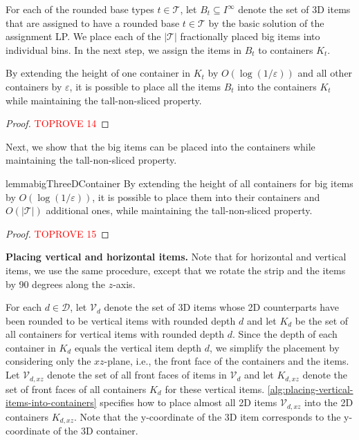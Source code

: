 \documentclass[a4paper,UKenglish,cleveref, autoref, thm-restate]{lipics-v2021}
\newcommand{\eps}{\varepsilon}
\newcommand{\bigy}{big\xspace}
\begin{document}
For each of the rounded base types $t \in \mathcal{T}$, let $B_t \subseteq I^{\infty}$ denote the set of 3D items that are assigned to have a rounded base $t \in \mathcal{T}$ by the basic solution of the assignment LP.  
We place each of the $|\mathcal{T}|$ fractionally placed \bigy items into individual bins.
In the next step, we assign the items in $B_t$ to containers $K_t$.

\begin{lemma}
\label{lem:placing-big-items-second-step}
By extending the height of one container in $K_t$ by $O(\log(1/\eps))$ and all other containers by $\eps$, it is possible to place all the items $B_t$ into the containers $K_t$ while maintaining the tall-non-sliced property.
\end{lemma}
\begin{proof}\textcolor{red}{TOPROVE 14}\end{proof}

Next, we show that the \bigy items can be placed into the containers while maintaining the tall-non-sliced property.

\begin{restatable}{lemma}{bigThreeDContainer}
\label{lem:packing-bins-into-containers}
By extending the height of all containers for \bigy items by $O(\log(1/\eps))$, it is possible to place them into their containers and $O(|\mathcal{T}|)$ additional ones, while maintaining the tall-non-sliced property.
\end{restatable}

\begin{proof}\textcolor{red}{TOPROVE 15}\end{proof}


\noindent \textbf{Placing vertical and horizontal items.}
Note that for horizontal and vertical items, we use the same procedure, except that we rotate the strip and the items by 90 degrees along the $z$-axis. 

For each $d\in \mathcal{D}$, let $\mathcal{V}_d$ denote the set of 3D items whose 2D counterparts have been rounded to be vertical items with rounded depth $d$ and let $K_d$ be the set of all containers for vertical items with rounded depth $d$. 
Since the depth of each container in $K_d$ equals the vertical item depth $d$, we simplify the placement by considering only the $xz$-plane, i.e., the front face of the containers and the items.
Let $\mathcal{V}_{d,xz}$ denote the set of all front faces of items in $\mathcal{V}_d$ and let $K_{d,xz}$ denote the set of front faces of all containers $K_d$ for these vertical items.
\cref{alg:placing-vertical-items-into-containers} specifies how to place almost all 2D items $\mathcal{V}_{d,xz}$ into the 2D containers $K_{d,xz}$.
Note that the y-coordinate of the 3D item corresponds to the y-coordinate of the 3D container.
\end{document}
